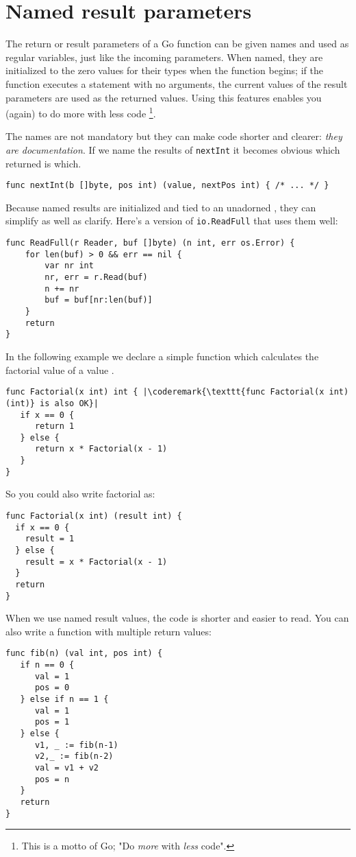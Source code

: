 \section{Named result parameters}
\label{sec:named result parameters}
The return or result parameters of a Go function can be given names and used
as regular variables, just like the incoming parameters. When named, they are
initialized to the zero values for their types when the function begins; if the
function executes a  statement with no arguments, the current values of
the result parameters are used as the returned values. Using this
features enables you (again) to do more with less code \footnote{This is
a motto of Go; "Do \emph{more} with \emph{less} code".}.

The names are not mandatory but they can make code shorter and clearer:
\emph{they are documentation}. 
If we name the results of \lstinline{nextInt} it becomes obvious which
returned  is which.

\begin{lstlisting}
func nextInt(b []byte, pos int) (value, nextPos int) { /* ... */ }
\end{lstlisting}
Because named results are initialized and tied to an unadorned
,
they can simplify as well as clarify. Here's a version of
\lstinline{io.ReadFull} that uses them well:

\begin{lstlisting}
func ReadFull(r Reader, buf []byte) (n int, err os.Error) {
    for len(buf) > 0 && err == nil {
        var nr int
        nr, err = r.Read(buf)
        n += nr
        buf = buf[nr:len(buf)]
    }
    return
}
\end{lstlisting}

In the following example we declare a simple function which calculates
the factorial value of a value .

\begin{lstlisting}
func Factorial(x int) int { |\coderemark{\texttt{func Factorial(x int) (int)} is also OK}|
   if x == 0 {
      return 1
   } else {
      return x * Factorial(x - 1)
   }
}
\end{lstlisting}
So you could also write factorial as:
\begin{lstlisting}
func Factorial(x int) (result int) {
  if x == 0 {
    result = 1	
  } else {
    result = x * Factorial(x - 1)
  }
  return
}
\end{lstlisting}
When we use named result values, the code is shorter and
easier to read.
You can also write a function with multiple return values:
\begin{lstlisting}
func fib(n) (val int, pos int) {
   if n == 0 {
      val = 1
      pos = 0
   } else if n == 1 {
      val = 1
      pos = 1
   } else {
      v1, _ := fib(n-1)
      v2,_ := fib(n-2)
      val = v1 + v2
      pos = n
   }
   return
}
\end{lstlisting}

